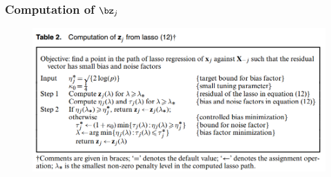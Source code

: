 \begin{frame}
\frametitle{Computation of $\bz_{j}$}
\begin{figure}[h]
  \centering
  \includegraphics[width=1.0\textwidth]{figs/Table2.png}
  \label{Table2}
\end{figure}
\end{frame}






